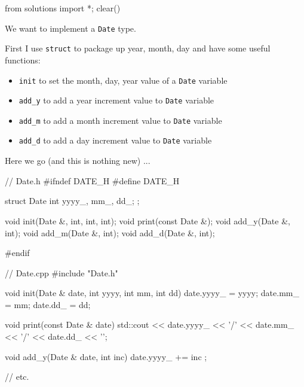 \begin{python0}
from solutions import *; clear()
\end{python0}

We want to implement a \texttt{Date} type.

First I use \texttt{struct} to package up year, month, day and have some
useful functions:

\begin{itemize}
\item \texttt{init} to set the month, day, year value of a \texttt{Date}
  variable
\item \texttt{add\_y} to add a year increment value to \texttt{Date} variable
\item \texttt{add\_m} to add a month increment value to \texttt{Date} variable
\item \texttt{add\_d} to add a day increment value to \texttt{Date} variable
\end{itemize}

Here we go (and this is nothing new) ...

\begin{consolethree}[escapeinside=||]
// Date.h
#ifndef DATE_H
#define DATE_H

struct Date
{
    int yyyy_, mm_, dd_;
};

void init(Date &, int, int, int);
void print(const Date &);
void add_y(Date &, int);
void add_m(Date &, int);
void add_d(Date &, int);

#endif
\end{consolethree}

\begin{consolethree}[escapeinside=||]
// Date.cpp
#include "Date.h"

void init(Date & date, int yyyy, int mm, int dd)
{
    date.yyyy_ = yyyy;
    date.mm_ = mm;
    date.dd_ = dd;
}

void print(const Date & date)
{
    std::cout << date.yyyy_ << '/'
              << date.mm_ << '/'
              << date.dd_ << '\n';
}

void add_y(Date & date, int inc)
{
    date.yyyy_ += inc ;
}

// etc.
\end{consolethree}

